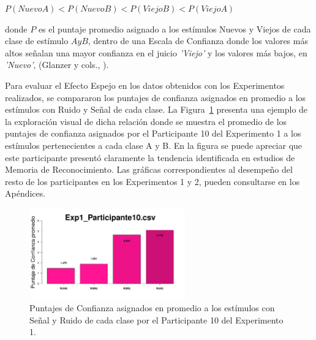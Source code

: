 \begin{center}
$P(NuevoA) < P(NuevoB) < P(ViejoB) < P(ViejoA)$\\
\end{center}
\begin{center}
donde $P$ es el puntaje promedio asignado a los estímulos Nuevos y Viejos de cada clase de estímulo $A y B$, dentro de una Escala de Confianza donde los valores más altos señalan una mayor confianza en el juicio \textit{'Viejo'} y los valores más bajos, en \textit{'Nuevo'}, (Glanzer y cols., \citeyear{Glanzer1993}).\\
\end{center}

Para evaluar el Efecto Espejo en los datos obtenidos con los Experimentos realizados, se compararon los puntajes de confianza asignados en promedio a los estímulos con Ruido y Señal de cada clase. La Figura~\ref{fig:MirrorRating_E1_P10} presenta una ejemplo de la exploración visual de dicha relación donde se muestra el promedio de los puntajes de confianza asignados por el Participante 10 del Experimento 1 a los estímulos pertenecientes a cada clase A y B. En la figura se puede apreciar que este participante presentó claramente la tendencia identificada en estudios de Memoria de Reconocimiento. Las gráficas correspondientes al desempeño del resto de los participantes en los Experimentos 1 y 2, pueden consultarse en los Apéndices.\\

\begin{figure}[th]
\centering
\includegraphics[width=0.60\textwidth]{Figures/MirrorRating_Exp1_P10}
\decoRule
\caption[Explorando datos individuales (ejemplo): Promedio de los puntajes de confianza registrados para cada tipo y clase de ensayo]{Puntajes de Confianza asignados en promedio a los estímulos con Señal y Ruido de cada clase por el Participante 10 del Experimento 1.}
\label{fig:MirrorRating_E1_P10}
\end{figure}

